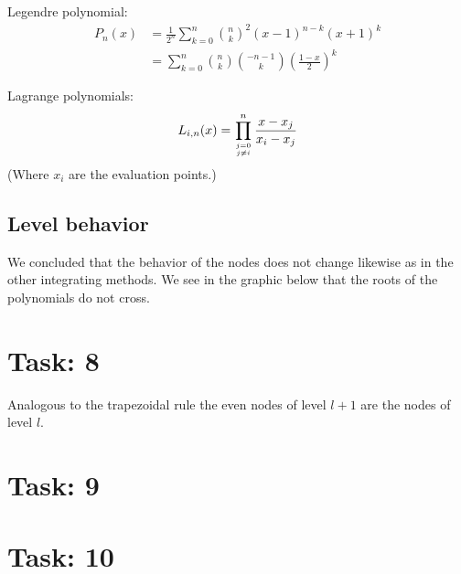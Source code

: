\documentclass{article}
\begin{document}
\noindent Legendre polynomial:
\begin{align*}
 P_n(x)&=\frac{1}{2^n}\sum_{k=0}^n {n \choose k}^2 (x-1)^{n-k}(x+1)^k \\
 &= \sum_{k=0}^n {n \choose k}{-n-1 \choose k}\left(\frac{1-x}{2}\right)^k
\end{align*}

\noindent Lagrange polynomials:
\begin{align*}
 L_{i,n}(x)=\prod_{j=0 \atop j\neq i}^n \frac{x-x_j}{x_i-x_j}
\end{align*}
(Where $x_i$ are the evaluation points.)

\subsection*{Level behavior}
We concluded that the behavior of the nodes does not change likewise as in the other integrating methods. We see in the graphic below that the roots of the polynomials do not cross.
\begin{figure}[htbp]
  \centering
\end{figure}

\section*{Task: 8}

Analogous to the trapezoidal rule the even nodes of level $l+1$ are the nodes of level $l$.

\section*{Task: 9}

\begin{figure}[htbp]
  \centering
\end{figure}

\section*{Task: 10}

\begin{figure}[htbp]
  \centering
\end{figure}
\end{document}
